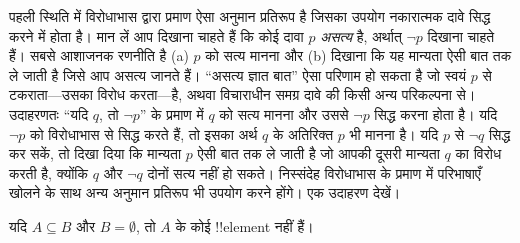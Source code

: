 \documentclass[../../../include/open-logic-section]{subfiles}
\begin{document}


पहली स्थिति में विरोधाभास द्वारा प्रमाण ऐसा अनुमान प्रतिरूप है जिसका उपयोग
नकारात्मक दावे सिद्ध करने में होता है। मान लें आप दिखाना चाहते हैं कि कोई
दावा $p$ \emph{असत्य} है, अर्थात् $\lnot p$ दिखाना चाहते हैं। सबसे आशाजनक
रणनीति है (a) $p$ को सत्य मानना और (b) दिखाना कि यह मान्यता ऐसी बात तक ले
जाती है जिसे आप असत्य जानते हैं। ``असत्य ज्ञात बात'' ऐसा परिणाम हो सकता है
जो स्वयं $p$ से टकराता---उसका विरोध करता---है, अथवा विचाराधीन समग्र दावे की
किसी अन्य परिकल्पना से। उदाहरणतः ``यदि $q$, तो $\lnot p$'' के प्रमाण में
$q$ को सत्य मानना और उससे $\lnot p$ सिद्ध करना होता है। यदि $\lnot p$ को
विरोधाभास से सिद्ध करते हैं, तो इसका अर्थ $q$ के अतिरिक्त $p$ भी मानना है।
यदि $p$ से $\lnot q$ सिद्ध कर सकें, तो दिखा दिया कि मान्यता $p$ ऐसी बात तक
ले जाती है जो आपकी दूसरी मान्यता $q$ का विरोध करती है, क्योंकि $q$ और
$\lnot q$ दोनों सत्य नहीं हो सकते। निस्संदेह विरोधाभास के प्रमाण में
परिभाषाएँ खोलने के साथ अन्य अनुमान प्रतिरूप भी उपयोग करने होंगे। एक उदाहरण
देखें।

\begin{prop}
  यदि $A\subseteq B$ और $B=\emptyset$, तो $A$ के कोई !!{element} नहीं हैं।
\end{prop}
\end{document}
